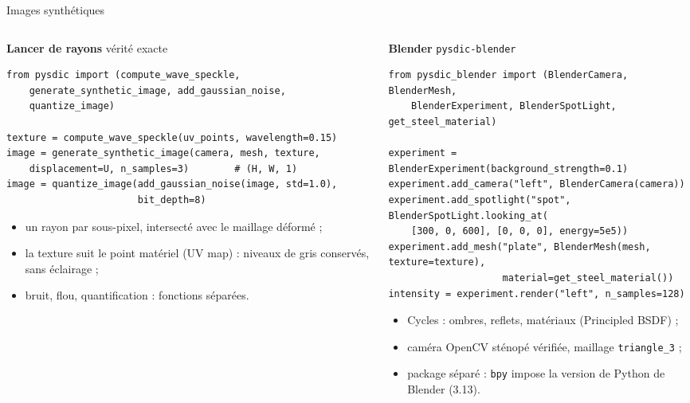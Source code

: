 \documentclass[aspectratio=169,11pt]{beamer}
\newcommand{\code}[1]{\texttt{\small #1}}
\begin{document}
\begin{frame}[fragile]{Images synthétiques}
  \begin{columns}[T]
    \begin{column}{0.49\textwidth}
      \textbf{Lancer de rayons} \hfill \small vérité exacte
\begin{lstlisting}[basicstyle=\ttfamily\tiny]
from pysdic import (compute_wave_speckle,
    generate_synthetic_image, add_gaussian_noise,
    quantize_image)

texture = compute_wave_speckle(uv_points, wavelength=0.15)
image = generate_synthetic_image(camera, mesh, texture,
    displacement=U, n_samples=3)        # (H, W, 1)
image = quantize_image(add_gaussian_noise(image, std=1.0),
                       bit_depth=8)
\end{lstlisting}
      \scriptsize
      \begin{itemize}\setlength{\itemsep}{0pt}
        \item un rayon par sous-pixel, intersecté avec le maillage déformé ;
        \item la texture suit le \alert{point matériel} (UV map) : niveaux de gris
              conservés, sans éclairage ;
        \item bruit, flou, quantification : fonctions séparées.
      \end{itemize}
    \end{column}
    \begin{column}{0.49\textwidth}
      \textbf{Blender} \hfill \small \texttt{pysdic-blender}
\begin{lstlisting}[basicstyle=\ttfamily\tiny]
from pysdic_blender import (BlenderCamera, BlenderMesh,
    BlenderExperiment, BlenderSpotLight, get_steel_material)

experiment = BlenderExperiment(background_strength=0.1)
experiment.add_camera("left", BlenderCamera(camera))
experiment.add_spotlight("spot", BlenderSpotLight.looking_at(
    [300, 0, 600], [0, 0, 0], energy=5e5))
experiment.add_mesh("plate", BlenderMesh(mesh, texture=texture),
                    material=get_steel_material())
intensity = experiment.render("left", n_samples=128)
\end{lstlisting}
      \scriptsize
      \begin{itemize}\setlength{\itemsep}{0pt}
        \item Cycles : ombres, reflets, matériaux (Principled BSDF) ;
        \item caméra OpenCV sténopé \alert{vérifiée}, maillage \code{triangle\_3} ;
        \item package \alert{séparé} : \texttt{bpy} impose la version de Python de Blender (3.13).
      \end{itemize}
    \end{column}
  \end{columns}
\end{frame}
\end{document}
